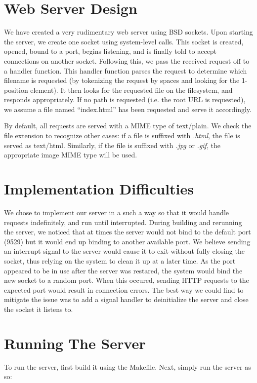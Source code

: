 \documentclass[12pt]{article}
\begin{document}
\maketitle

\section{Web Server Design}
We have created a very rudimentary web server using BSD sockets. Upon starting the server, we create one socket using system-level calls. This socket is created, opened, bound to a port, begins listening, and is finally told to accept connections on another socket. Following this, we pass the received request off to a handler function. This handler function parses the request to determine which filename is requested (by tokenizing the request by spaces and looking for the 1-position element). It then looks for the requested file on the filesystem, and responds appropriately. If no path is requested (i.e. the root URL is requested), we assume a file named ``index.html'' has been requested and serve it accordingly.

By default, all requests are served with a MIME type of text/plain. We check the file extension to recognize other cases: if a file is suffixed with \emph{.html}, the file is served as text/html. Similarly, if the file is suffixed with \emph{.jpg} or \emph{.gif}, the appropriate image MIME type will be used.

\section{Implementation Difficulties}
We chose to implement our server in a such a way so that it would handle requests indefinitely, and run until interrupted. During building and rerunning the server, we noticed that at times the server would not bind to the default port (9529) but it would end up binding to another available port. We believe sending an interrupt signal to the server would cause it to exit without fully closing the socket, thus relying on the system to clean it up at a later time. As the port appeared to be in use after the server was restared, the system would bind the new socket to a random port. When this occured, sending HTTP requests to the expected port would result in connection errors. The best way we could find to mitigate the issue was to add a signal handler to deinitialize the server and close the socket it listens to.

\section{Running The Server}
To run the server, first build it using the Makefile.
Next, simply run the server as so:
\end{document}
